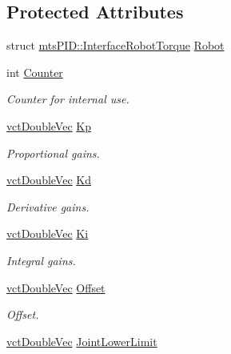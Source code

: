 \subsection*{Protected Attributes}
\begin{DoxyCompactItemize}
\item 
struct \hyperlink{structmts_p_i_d_1_1_interface_robot_torque}{mts\+P\+I\+D\+::\+Interface\+Robot\+Torque} \hyperlink{classmts_p_i_d_a17e9ab759f0051e59244d3a211ba6791}{Robot}
\item 
int \hyperlink{classmts_p_i_d_a7a1c2963d1d2b65a210464b9ef0d775f}{Counter}
\begin{DoxyCompactList}\small\item\em Counter for internal use. \end{DoxyCompactList}\item 
\hyperlink{vct_dynamic_vector_types_8h_ade4b3068c86fb88f41af2e5187e491c2}{vct\+Double\+Vec} \hyperlink{classmts_p_i_d_a0aa502158f417e137495a5c2ded4c5d0}{Kp}
\begin{DoxyCompactList}\small\item\em Proportional gains. \end{DoxyCompactList}\item 
\hyperlink{vct_dynamic_vector_types_8h_ade4b3068c86fb88f41af2e5187e491c2}{vct\+Double\+Vec} \hyperlink{classmts_p_i_d_a4d288bb566a2c45834c1f028cad03b3f}{Kd}
\begin{DoxyCompactList}\small\item\em Derivative gains. \end{DoxyCompactList}\item 
\hyperlink{vct_dynamic_vector_types_8h_ade4b3068c86fb88f41af2e5187e491c2}{vct\+Double\+Vec} \hyperlink{classmts_p_i_d_a979243fca1ea255c49b241658246d964}{Ki}
\begin{DoxyCompactList}\small\item\em Integral gains. \end{DoxyCompactList}\item 
\hyperlink{vct_dynamic_vector_types_8h_ade4b3068c86fb88f41af2e5187e491c2}{vct\+Double\+Vec} \hyperlink{classmts_p_i_d_a34993725f4bc1309971924b62549376c}{Offset}
\begin{DoxyCompactList}\small\item\em Offset. \end{DoxyCompactList}\item 
\hyperlink{vct_dynamic_vector_types_8h_ade4b3068c86fb88f41af2e5187e491c2}{vct\+Double\+Vec} \hyperlink{classmts_p_i_d_a4156fdfac35c3175ad1731dbcdcba8f2}{Joint\+Lower\+Limit}

\end{DoxyCompactItemize}
